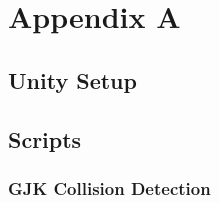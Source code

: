 %
%

\chapter{Appendix A}\label{app:app01}

\section{Unity Setup}\label{sec:unity_setup}

\section*{Scripts}

\subsection*{GJK Collision Detection}

